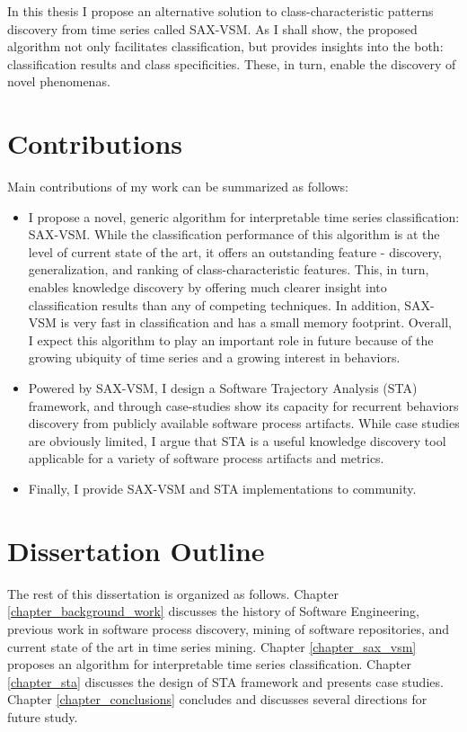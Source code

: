 In this thesis I propose an alternative solution to class-characteristic patterns discovery from time series called 
SAX-VSM. As I shall show, the proposed algorithm not only facilitates classification, but provides insights into 
the both: classification results and class specificities. These, in turn, enable the discovery of novel phenomenas.

\section{Contributions}\label{section_contributions}
Main contributions of my work can be summarized as follows: 
\begin{itemize}
\item I propose a novel, generic algorithm for interpretable time series classification: SAX-VSM. 
While the classification performance of this algorithm is at the level of current state of the art, 
it offers an outstanding feature - discovery, generalization, and ranking of class-characteristic features. 
This, in turn, enables knowledge discovery by offering much clearer insight into classification results than any of 
competing techniques.
In addition, SAX-VSM is very fast in classification and has a small memory footprint. 
Overall, I expect this algorithm to play an important role in future because of the growing ubiquity of time series and 
a growing interest in behaviors.
\item Powered by SAX-VSM, I design a Software Trajectory Analysis (STA) framework, and through case-studies 
show its capacity for recurrent behaviors discovery from publicly available software process
artifacts. While case studies are obviously limited, I argue that STA is a useful knowledge discovery tool applicable for a 
variety of software process artifacts and metrics. 
\item Finally, I provide SAX-VSM and STA implementations to community.
\end{itemize}

\section{Dissertation Outline}\label{section_organization}
The rest of this dissertation is organized as follows. Chapter \ref{chapter_background_work} discusses the history 
of Software Engineering, previous work in software process discovery, mining of software repositories, and current 
state of the art in time series mining. Chapter \ref{chapter_sax_vsm} proposes an algorithm for interpretable 
time series classification. Chapter \ref{chapter_sta} discusses the design of STA framework and presents case studies.
Chapter \ref{chapter_conclusions} concludes and discusses several directions for future study.